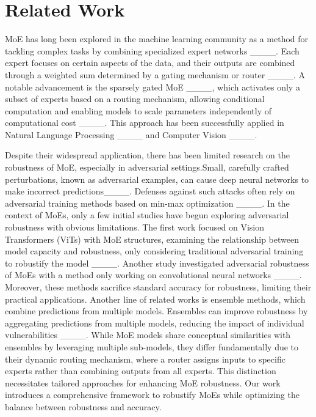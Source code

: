 \section{Related Work}
MoE has long been explored in the machine learning community as a method for tackling complex tasks by combining specialized expert networks ____. Each expert focuses on certain aspects of the data, and their outputs are combined through a weighted sum determined by a gating mechanism or router ____. A notable advancement is the sparsely gated MoE ____, which activates only a subset of experts based on a routing mechanism, allowing conditional computation and enabling models to scale parameters independently of computational cost ____. This approach has been successfully applied in Natural Language Processing ____ and Computer Vision ____. 

Despite their widespread application, there has been limited research on the robustness of MoE, especially in adversarial settings.Small, carefully crafted perturbations, known as adversarial examples, can cause deep neural networks to make incorrect predictions____. Defenses against such attacks often rely on adversarial training methods based on min-max optimization ____. In the context of MoEs, only a few initial studies have begun exploring adversarial robustness with obvious limitations. The first work focused on Vision Transformers (ViTs) with MoE structures, examining the relationship between model capacity and robustness, only considering traditional adversarial training to robustify the model ____. Another study investigated adversarial robustness of MoEs with a method only working on convolutional neural networks ____. Moreover, these methods sacrifice standard accuracy for robustness, limiting their practical applications. Another line of related works is ensemble methods, which combine predictions from multiple models. Ensembles can improve robustness by aggregating predictions from multiple models, reducing the impact of individual vulnerabilities ____. While MoE models share conceptual similarities with ensembles by leveraging multiple sub-models, they differ fundamentally due to their dynamic routing mechanism, where a router assigns inputs to specific experts rather than combining outputs from all experts. This distinction necessitates tailored approaches for enhancing MoE robustness. Our work introduces a comprehensive framework to robustify MoEs while optimizing the balance between robustness and accuracy.